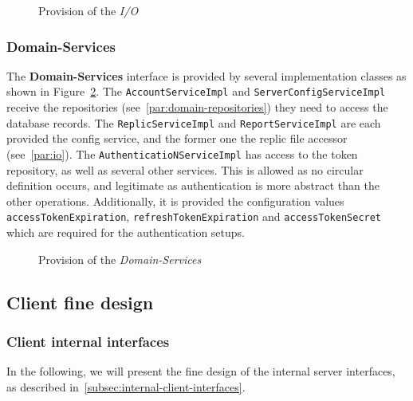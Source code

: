 \begin{figure}
    \centering

    \caption{Provision of the \textit{I/O}}
    \label{fig:domain-io-p}
\end{figure}

\subsubsection{Domain-Services}
The \textbf{Domain-Services} interface is provided by several implementation classes as shown in Figure~\ref{fig:domain-services-p}. \newline
The \texttt{AccountServiceImpl} and \texttt{ServerConfigServiceImpl} receive the repositories (see~\ref{par:domain-repositories}) they need to access the database records. \newline
The \texttt{ReplicServiceImpl} and \texttt{ReportServiceImpl} are each provided the config service, and the former one the replic file accessor (see~\ref{par:io}). \newline
The \texttt{AuthenticatioNServiceImpl} has access to the token repository, as well as several other services.
This is allowed as no circular definition occurs, and legitimate as authentication is more abstract than the other operations.
Additionally, it is provided the configuration values \texttt{accessTokenExpiration}, \texttt{refreshTokenExpiration} and \texttt{accessTokenSecret} which are required for the authentication setups.

\begin{figure}
    \centering

    \caption{Provision of the \textit{Domain-Services}}
    \label{fig:domain-services-p}
\end{figure}

\subsection{Client fine design}\label{subsec:client-fine-design-common}

\subsubsection{Client internal interfaces}
In the following, we will present the fine design of the internal server interfaces, as described in~\ref{subsec:internal-client-interfaces}.

